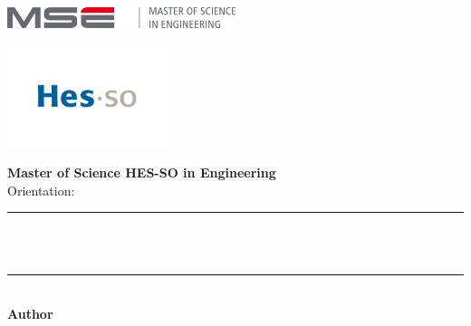 
\begin{titlepage}
\begin{center}

    \begin{minipage}{0.5\textwidth}
        \raggedright
        \includegraphics[height=0.6cm]{img/mse_logo}  %
    \end{minipage}%
    \begin{minipage}{0.5\textwidth}
        \raggedleft
        \includegraphics[height=3cm]{img/HES_SO_Logo_RGB}  %
    \end{minipage}

    \vspace{1cm}

    {\large \textbf{Master of Science HES-SO in Engineering}}\\
    {\large Orientation: \Orientation}\\[2cm]

    \rule{\textwidth}{0.4mm} \\[0.5cm]
    {\Huge \textbf{\ThesisTitle}}\\[0.3cm]
    \rule{\textwidth}{0.4mm}\\[1cm]
    

    
    {\LARGE \textbf{Author}}\\[0.1cm]
    {\Large \Author}\\[0.8cm]
    {\Large \textit{\ThesisSubject}}\\[2cm]


\end{center}
\end{titlepage}
